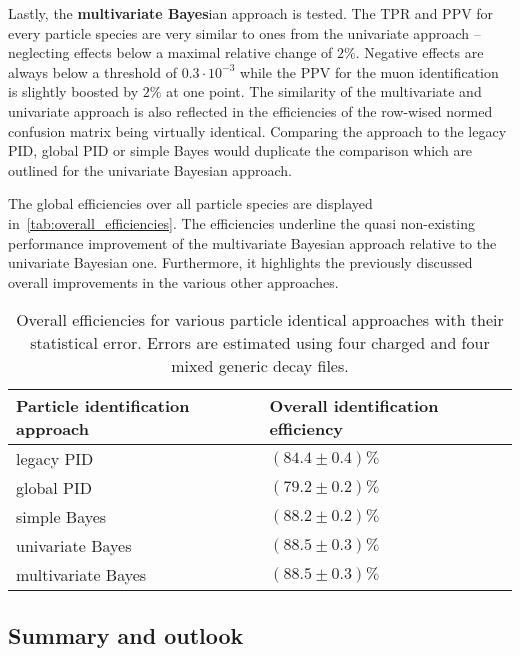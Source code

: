 Lastly, the \textbf{multivariate Bayes}ian approach is tested. The TPR and PPV for every particle species are very similar to ones from the univariate approach -- neglecting effects below a maximal relative change of $2 \%$. Negative effects are always below a threshold of $0.3 \cdot 10^{-3}$ while the PPV for the muon identification is slightly boosted by $2 \%$ at one point.
The similarity of the multivariate and univariate approach is also reflected in the efficiencies of the row-wised normed confusion matrix being virtually identical. Comparing the approach to the legacy PID, global PID or simple Bayes would duplicate the comparison which are outlined for the univariate Bayesian approach.

The global efficiencies over all particle species are displayed in~\autoref{tab:overall_efficiencies}. The efficiencies underline the quasi non-existing performance improvement of the multivariate Bayesian approach relative to the univariate Bayesian one. Furthermore, it highlights the previously discussed overall improvements in the various other approaches.

\begin{table}[ht]
	\centering
	\begin{tabular}{l|l}
		Particle identification approach & Overall identification efficiency \\
		\hline
		legacy PID & $(84.4 \pm 0.4) \%$ \\ %
		global PID & $(79.2 \pm 0.2) \%$ \\ %
		simple Bayes & $(88.2 \pm 0.2) \%$ \\ %
		univariate Bayes & $(88.5 \pm 0.3) \%$ \\ %
		multivariate Bayes & $(88.5 \pm 0.3) \%$ %
	\end{tabular}
	\caption{Overall efficiencies for various particle identical approaches with their statistical error. Errors are estimated using four charged and four mixed generic decay files.}
	\label{tab:overall_efficiencies}
\end{table}

\subsection{Summary and outlook}
\label{subsc:bayesian_approach_summary}

